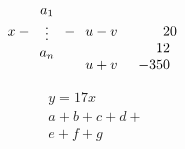 \documentclass[12pt]{article}
\begin{document}
$$ x - \begin{array}{c}
a_{1} \\ \vdots  \\
a_{n}
\end{array}
- \begin{array}[t]{cr}
u-v & 20\\
u+v & \begin{array}[b]{r}
12 \\ -350  \end{array}
\end{array}$$

\begin{eqnarray}
y=17x\\
a+b+c+d+ \nonumber \\
e+f+g 
\end{eqnarray}
\end{document}
